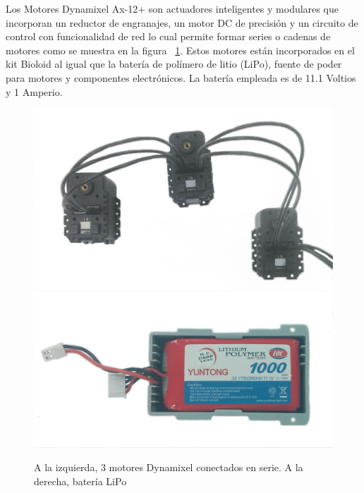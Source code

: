 Los Motores Dynamixel Ax-12+ son actuadores inteligentes y modulares que incorporan un reductor de engranajes, un motor DC de precisión y un circuito de control con funcionalidad de red lo cual permite formar series o cadenas de motores como se muestra en la figura ~\ref{MotorBateria}. Estos motores están incorporados en el kit Bioloid al igual que la batería de polímero de litio (LiPo), fuente de poder para motores y componentes electr\'onicos. La batería empleada es de 11.1 Voltios y 1 Amperio. \cite{bateria}



\begin{figure}[hbtp]
\centering
\includegraphics[scale=0.08]{imagenes/3Dynamixel.jpg}
\includegraphics[scale=0.08]{imagenes/bateriaLipo.jpg}
\caption{A la izquierda, 3 motores Dynamixel conectados en serie. A la derecha, batería LiPo}
\label{MotorBateria}
\end{figure}

